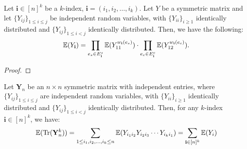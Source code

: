 \begin{lemma}
    \label{lem:expectation_matrix_multi_index}
    \notready
    Let $\mathbf{i} \in[n]^k$ be a $k$-index, $\mathbf{i}=\left(i_1, i_2, \ldots, i_k\right)$. Let $Y$ be a symmetric matrix and let $\{Y_{ij}\}_{1\le i\le j}$ be independent random variables, with $\{Y_{ii}\}_{i\ge 1}$ identically distributed and $\{Y_{ij}\}_{1\le i<j}$ identically distributed. Then, we have the following:
    $$
    \mathbb{E}(Y_{\mathbf{i}}) = \prod_{e_s \in E_{\mathbf{i}}^s} \mathbb{E}(Y_{11}^{w_{\mathbf{i}}(e_s)}) \cdot \prod_{e_c \in E_{\mathbf{i}}^c} \mathbb{E}(Y_{12}^{w_{\mathbf{i}}(e_c)}).
    $$
\end{lemma}

\begin{proof}
\end{proof}

\begin{lemma}
    \label{lem:trace_expectation_of_matrix}
    \notready
    Let $\mathbf{Y}_{n}$ be an $n \times n$ symmetric matrix with independent entries, where $\{Y_{ij}\}_{1\le i\le j}$ are independent random variables, with $\{Y_{ii}\}_{i\ge 1}$ identically distributed and $\{Y_{ij}\}_{1\le i<j}$ identically distributed. Then, for any $k$-index $\mathbf{i} \in [n]^k$, we have:
    $$
    \mathbb{E}(\operatorname{Tr}(\mathbf{Y}_{n}^{k})) = \sum_{1 \leq i_1, i_2, \ldots, i_k \leq n} \mathbb{E}(Y_{i_1 i_2} Y_{i_2 i_3} \cdots Y_{i_k i_1}) = \sum_{\mathbf{i} \in [n]^{k}} \mathbb{E}(Y_{i})
    $$
\end{lemma}

